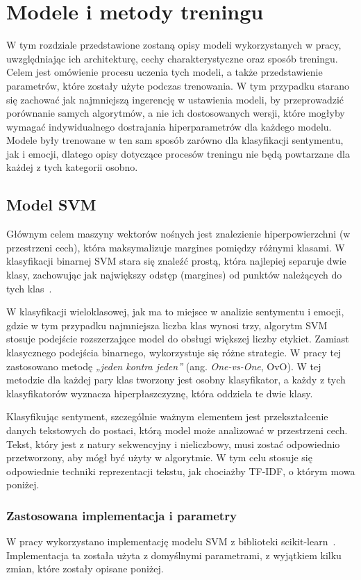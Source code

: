\chapter{Modele i metody treningu}
W tym rozdziale przedstawione zostaną opisy modeli wykorzystanych w pracy, uwzględniając ich architekturę, cechy charakterystyczne oraz sposób treningu. Celem jest omówienie procesu uczenia tych modeli, a także przedstawienie parametrów, które zostały użyte podczas trenowania. W tym przypadku starano się zachować jak najmniejszą ingerencję w ustawienia modeli, by przeprowadzić porównanie samych algorytmów, a nie ich dostosowanych wersji, które mogłyby wymagać indywidualnego dostrajania hiperparametrów dla każdego modelu. Modele były trenowane w ten sam sposób zarówno dla klasyfikacji sentymentu, jak i emocji, dlatego opisy dotyczące procesów treningu nie będą powtarzane dla każdej z tych kategorii osobno.

\section{Model SVM}
Głównym celem maszyny wektorów nośnych jest znalezienie hiperpowierzchni (w przestrzeni cech), która maksymalizuje margines pomiędzy różnymi klasami. W klasyfikacji binarnej SVM stara się znaleźć prostą, która najlepiej separuje dwie klasy, zachowując jak największy odstęp (margines) od punktów należących do tych klas~\cite{UczMasz}.

W klasyfikacji wieloklasowej, jak ma to miejsce w analizie sentymentu i emocji, gdzie w tym przypadku najmniejsza liczba klas wynosi trzy, algorytm SVM stosuje podejście rozszerzające model do obsługi większej liczby etykiet. Zamiast klasycznego podejścia binarnego, wykorzystuje się różne strategie. W pracy tej zastosowano metodę \textit{„jeden kontra jeden”} (ang. \textit{One-vs-One}, OvO). W tej metodzie dla każdej pary klas tworzony jest osobny klasyfikator, a każdy z tych klasyfikatorów wyznacza hiperpłaszczyznę, która oddziela te dwie klasy.

Klasyfikując sentyment, szczególnie ważnym elementem jest przekształcenie danych tekstowych do postaci, którą model może analizować w przestrzeni cech. Tekst, który jest z natury sekwencyjny i nieliczbowy, musi zostać odpowiednio przetworzony, aby mógł być użyty w algorytmie. W tym celu stosuje się odpowiednie techniki reprezentacji tekstu, jak chociażby TF-IDF, o którym mowa poniżej.

\subsection{Zastosowana implementacja i parametry}
W pracy wykorzystano implementację modelu SVM z biblioteki scikit-learn~\cite{SKLearnSVM}. Implementacja ta została użyta z domyślnymi parametrami, z wyjątkiem kilku zmian, które zostały opisane poniżej.

